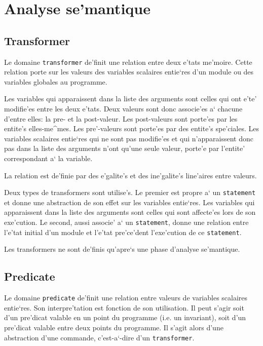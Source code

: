 \section{Analyse se'mantique}
\label{semantics}

\subsection{Transformer}
\label{subsection-transformer}

{
Le domaine {\tt transformer} de'finit une relation entre deux e'tats
me'moire. Cette relation
porte sur les valeurs des variables scalaires entie`res d'un module ou
des variables globales au programme.

Les variables qui apparaissent dans la liste des arguments sont celles
qui ont e'te' modifie'es entre les deux e'tats. Deux valeurs
sont donc associe'es a` chacune d'entre elles: la pre- et la
post-valeur.  Les post-valeurs sont porte'es par les entite's
elles-me^mes. Les pre'-valeurs sont porte'es par des entite's
spe'ciales. Les variables scalaires entie`res qui ne sont pas modifie'es
et qui n'apparaissent donc pas dans la liste des arguments n'ont qu'une
seule valeur, porte'e par l'entite' correspondant a` la variable.

La relation est de'finie par des e'galite's et des ine'galite's
line'aires entre valeurs.

Deux types de transformers sont utilise's. Le premier est propre a` un
{\tt statement} et donne une abstraction de son effet sur les variables
entie`res. Les variables qui apparaissent dans la liste des arguments
sont celles qui sont affecte'es lors de son exe'cution.  Le second,
aussi associe' a` un {\tt statement}, donne une relation entre l'e'tat
initial d'un module et l'e'tat pre'ce'dent l'exe'cution de ce {\tt statement}.

Les transformers ne sont de'finis qu'apre`s une phase d'analyse se'mantique.
}

\subsection{Predicate}
\label{subsection-predicate}

{
Le domaine {\tt predicate} de'finit une relation entre valeurs de
variables scalaires entie`res. Son interpre'tation est fonction de
son utilisation. Il peut s'agir soit d'un pre'dicat valable en
un point du programme (i.e. un invariant), soit d'un pre'dicat
valable entre deux points du programme. Il s'agit alors d'une
abstraction d'une commande, c'est-a`-dire d'un {\tt transformer}.
}

